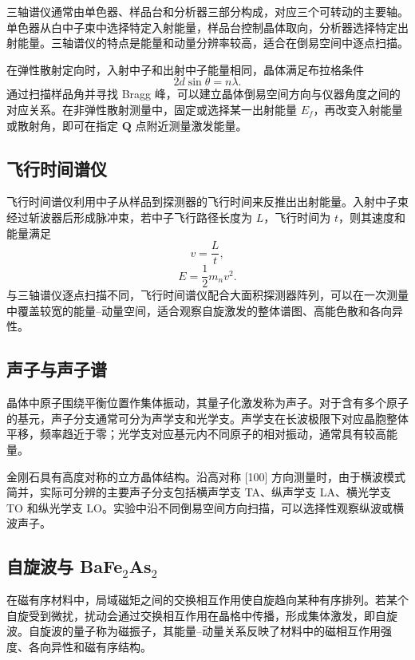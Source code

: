 \documentclass[a4paper]{ctexart}
\begin{document}
三轴谱仪通常由单色器、样品台和分析器三部分构成，对应三个可转动的主要轴。单色器从白中子束中选择特定入射能量，样品台控制晶体取向，分析器选择特定出射能量。三轴谱仪的特点是能量和动量分辨率较高，适合在倒易空间中逐点扫描。

在弹性散射定向时，入射中子和出射中子能量相同，晶体满足布拉格条件
\begin{equation}
    2d\sin\theta = n\lambda .
\end{equation}
通过扫描样品角并寻找 Bragg 峰，可以建立晶体倒易空间方向与仪器角度之间的对应关系。在非弹性散射测量中，固定或选择某一出射能量 $E_f$，再改变入射能量或散射角，即可在指定 $\mathbf{Q}$ 点附近测量激发能量。

\subsection{飞行时间谱仪}

飞行时间谱仪利用中子从样品到探测器的飞行时间来反推出出射能量。入射中子束经过斩波器后形成脉冲束，若中子飞行路径长度为 $L$，飞行时间为 $t$，则其速度和能量满足
\begin{equation}
    v=\frac{L}{t},
\end{equation}
\begin{equation}
    E=\frac{1}{2}m_n v^2 .
\end{equation}
与三轴谱仪逐点扫描不同，飞行时间谱仪配合大面积探测器阵列，可以在一次测量中覆盖较宽的能量--动量空间，适合观察自旋激发的整体谱图、高能色散和各向异性。

\subsection{声子与声子谱}

晶体中原子围绕平衡位置作集体振动，其量子化激发称为声子。对于含有多个原子的基元，声子分支通常可分为声学支和光学支。声学支在长波极限下对应晶胞整体平移，频率趋近于零；光学支对应基元内不同原子的相对振动，通常具有较高能量。

金刚石具有高度对称的立方晶体结构。沿高对称 [100] 方向测量时，由于横波模式简并，实际可分辨的主要声子分支包括横声学支 TA、纵声学支 LA、横光学支 TO 和纵光学支 LO。实验中沿不同倒易空间方向扫描，可以选择性观察纵波或横波声子。

\subsection{自旋波与 BaFe$_2$As$_2$}

在磁有序材料中，局域磁矩之间的交换相互作用使自旋趋向某种有序排列。若某个自旋受到微扰，扰动会通过交换相互作用在晶格中传播，形成集体激发，即自旋波。自旋波的量子称为磁振子，其能量--动量关系反映了材料中的磁相互作用强度、各向异性和磁有序结构。
\end{document}
